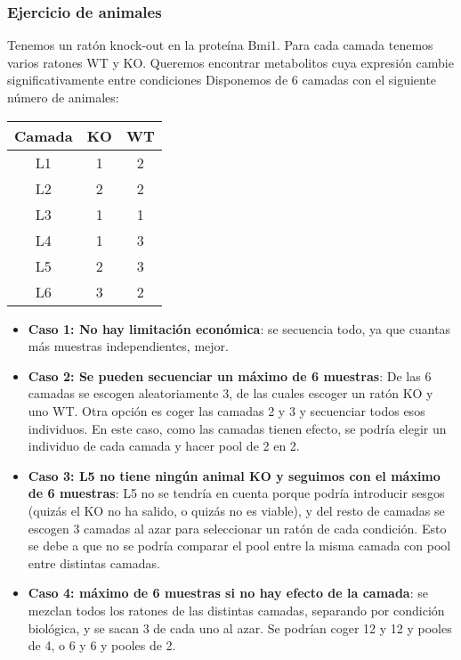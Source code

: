 \subsubsection{Ejercicio de animales}
Tenemos un ratón knock-out en la proteína Bmi1. Para cada camada tenemos varios ratones WT y KO. Queremos encontrar metabolitos cuya expresión cambie significativamente entre condiciones
Disponemos de 6 camadas con el siguiente número de animales:
\begin{table}[h]
\centering
\begin{tabular}{c | c c}
Camada & KO & WT \\ \hline
L1 & 1 & 2 \\
L2 & 2 & 2 \\
L3 & 1 & 1 \\
L4 & 1 & 3 \\
L5 & 2 & 3 \\
L6 & 3 & 2 
\end{tabular}
\end{table}

\begin{itemize}
\item \textbf{Caso 1: No hay limitación económica}: se secuencia todo, ya que cuantas más muestras independientes, mejor.
\item \textbf{Caso 2: Se pueden secuenciar un máximo de 6 muestras}: De las 6 camadas se escogen aleatoriamente 3, de las cuales escoger un ratón KO y uno WT. Otra opción es coger las camadas 2 y 3 y secuenciar todos esos individuos. En este caso, como las camadas tienen efecto, se podría elegir un individuo de cada camada y hacer pool de 2 en 2. 
\item \textbf{Caso 3: L5 no tiene ningún animal KO y seguimos con el máximo de 6 muestras}: L5 no se tendría en cuenta porque podría introducir sesgos (quizás el KO no ha salido, o quizás no es viable), y del resto de camadas se escogen 3 camadas al azar para seleccionar un ratón de cada condición. Esto se debe a que no se podría comparar el pool entre la misma camada con pool entre distintas camadas.
\item \textbf{Caso 4: máximo de 6 muestras si no hay efecto de la camada}: se mezclan todos los ratones de las distintas camadas, separando por condición biológica, y se sacan 3 de cada uno al azar. Se podrían coger 12 y 12 y pooles de 4, o 6 y 6 y pooles de 2.
\end{itemize}

